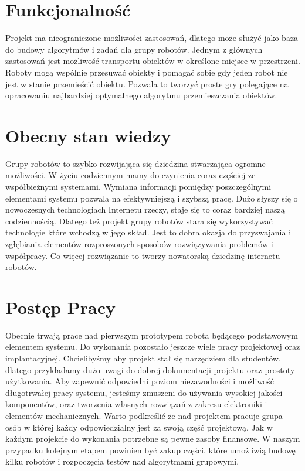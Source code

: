 \documentclass[a4paper, 12pt]{article}
\begin{document}
\section{Funkcjonalność}
Projekt ma nieograniczone możliwości zastosowań, dlatego może służyć jako baza do budowy algorytmów i zadań dla grupy robotów. Jednym z głównych zastosowań jest możliwość transportu obiektów w określone miejsce w przestrzeni. Roboty mogą wspólnie przesuwać obiekty i pomagać sobie gdy jeden robot nie jest w stanie przemieścić obiektu. Pozwala to tworzyć proste gry polegające na opracowaniu najbardziej optymalnego algorytmu przemieszczania obiektów. 

\section{Obecny stan wiedzy}
Grupy robotów to szybko rozwijająca się dziedzina stwarzająca ogromne możliwości. W życiu codziennym mamy do czynienia coraz częściej ze współbieżnymi systemami. Wymiana informacji pomiędzy poszczególnymi elementami systemu pozwala na efektywniejszą i szybszą pracę. Dużo słyszy się o nowoczesnych technologiach Internetu rzeczy, staje się to coraz bardziej naszą codziennością. Dlatego też projekt grupy robotów stara się wykorzystywać technologie które wchodzą w jego skład. Jest to dobra okazja do przyswajania i zgłębiania elementów rozproszonych sposobów rozwiązywania problemów i współpracy. Co więcej rozwiązanie to tworzy nowatorską dziedzinę internetu robotów. 

\section{Postęp Pracy}
Obecnie trwają prace nad pierwszym prototypem robota będącego podstawowym elementem systemu. Do wykonania pozostało jeszcze wiele pracy projektowej oraz implantacyjnej. Chcielibyśmy aby projekt stał się narzędziem dla studentów, dlatego przykładamy dużo uwagi do dobrej dokumentacji projektu oraz prostoty użytkowania. Aby zapewnić odpowiedni poziom niezawodności i możliwość długotrwałej pracy systemu, jesteśmy zmuszeni do używania wysokiej jakości komponentów, oraz tworzenia własnych rozwiązań z zakresu elektroniki i elementów mechanicznych. Warto podkreślić że nad projektem pracuje grupa osób w której każdy odpowiedzialny jest za swoją część projektową. Jak w każdym projekcie do wykonania potrzebne są pewne zasoby finansowe. W naszym przypadku kolejnym etapem powinien być zakup części, które umożliwią budowę kilku robotów i rozpoczęcia testów nad algorytmami grupowymi. 
\end{document}

